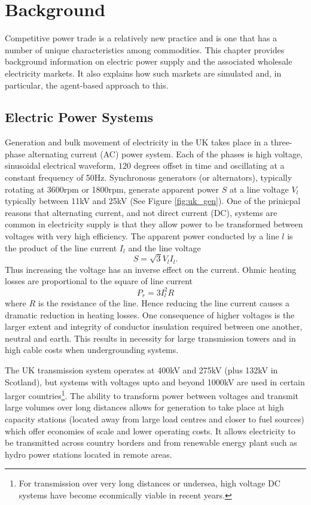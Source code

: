 \chapter{Background}
\label{ch:background}
Competitive power trade is a relatively new practice and is one that has a
number of unique characteristics among commodities.  This chapter provides
background information on electric power supply and the associated wholesale
electricity markets.  It also explains how such markets are simulated and, in
particular, the agent-based approach to this.

\section{Electric Power Systems}

Generation and bulk movement of electricity in the UK takes place in a
three-phase alternating current (AC) power system.  Each of the phases is
high voltage, sinusoidal electrical waveform, $120$ degrees offset in time
and oscillating at a constant frequency of 50Hz.  Synchronous generators (or
alternators), typically rotating at 3600rpm or 1800rpm, generate apparent power
$S$ at a line voltage $V_l$ typically between
11kV and 25kV (See Figure \ref{fig:uk_gen}).  One of the prinicpal reasons that
alternating current, and not direct current (DC), systems are common in electricity supply is that they
allow power to be transformed between voltages with very high efficiency.  The
apparent power conducted by a line $l$ is the product of the line current
$I_l$ and the line voltage
\begin{equation}
S = \sqrt{3} V_l I_l .
\end{equation}
Thus increasing the voltage has an inverse effect on the current.
Ohmic heating losses are proportional to the square of line current
\begin{equation}
P_{r} = 3 I_l^2 R
\end{equation}
where $R$ is the resistance of the line.  Hence reducing the line current
causes a dramatic reduction in heating losses.  One consequence of higher
voltages is the larger extent and integrity of conductor insulation required between
one another, neutral and earth.  This results in necessity for large
transmission towers and in high cable costs when undergrounding systems.

The UK transmission system operates at 400kV and 275kV (plus 132kV in
Scotland), but systems with voltages upto and beyond 1000kV are used in certain
larger countries\footnote{For transmission over very long distances or
undersea, high voltage DC systems have become econmically viable in recent
years.}.  The ability to transform power between voltages and transmit large
volumes over long distances allows for generation to take place at high
capacity stations (located away from large load centres and closer to fuel
sources) which offer economies of scale and lower operating costs.  It allows
electricity to be transmitted across country borders and from renewable
energy plant such as hydro power stations located in remote areas.

